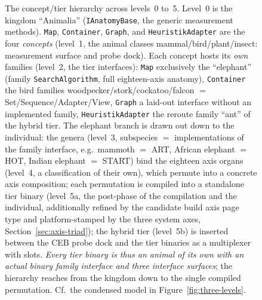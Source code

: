 \begin{nurlang}
\begin{figure}[htbp]
\caption[The four concepts and the tier hierarchy down to the compiled binary]{The concept/tier hierarchy across levels~0 to~5. Level~0 is the kingdom \enquote{Animalia} (\texttt{IAnatomyBase}, the generic measurement methods). \texttt{Map}, \texttt{Container}, \texttt{Graph}, and \texttt{HeuristikAdapter} are the four \emph{concepts} (level~1, the animal classes mammal/bird/plant/insect: measurement surface and probe dock). Each concept hosts its \emph{own} families (level~2, the tier interfaces): \texttt{Map} exclusively the \enquote{elephant} (family \texttt{SearchAlgorithm}, full eighteen-axis anatomy), \texttt{Container} the bird families woodpecker/stork/cockatoo/falcon $=$ Set/Sequence/Adapter/View, \texttt{Graph} a laid-out interface without an implemented family, \texttt{HeuristikAdapter} the reroute family \enquote{ant} of the hybrid tier. The elephant branch is drawn out down to the individual: the genera (level~3, subspecies $=$ implementations of the family interface, e.g.\ mammoth $=$ ART, African elephant $=$ HOT, Indian elephant $=$ START) bind the eighteen axis organs (level~4, a classification of their own), which permute into a concrete axis composition; each permutation is compiled into a standalone tier binary (level~5a, the post-phase of the compilation and the individual, additionally refined by the candidate build axis page type and platform-stamped by the three system axes, Section~\ref{sec:axis-triad}); the hybrid tier (level~5b) is inserted between the CEB probe dock and the tier binaries as a multiplexer with slots\@. \emph{Every tier binary is thus an animal of its own with an actual binary family interface and three interface surfaces}; the hierarchy reaches from the kingdom down to the single compiled permutation. Cf.\ the condensed model in Figure~\ref{fig:three-levels}.}\label{fig:genera}
\end{figure}
\end{nurlang}
